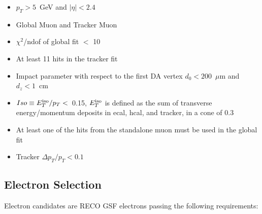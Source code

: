 \begin{itemize}

\item $p_{T} > 5$~GeV and $|\eta| < 2.4$

\item Global Muon and Tracker Muon

\item $\chi^2$/ndof of global fit $<$ 10

\item At least 11 hits in the tracker fit

\item Impact parameter with respect to the first DA vertex $d_{0} < 200$~$\mu$m and $d_{z} < 1$~cm

\item $Iso \equiv E_T^{\rm iso}/p_T < $~0.15, $E_T^{\rm iso}$ is defined as the sum of 
transverse energy/momentum deposits in ecal, hcal, and tracker, in a cone of 0.3

\item At least one of the hits from the 
standalone muon must be used in the global fit

\item Tracker $\Delta p_T/p_T < 0.1$

\end{itemize}



\subsection{Electron Selection}
\label{sec:electron}

Electron candidates are RECO GSF electrons passing the following requirements:

